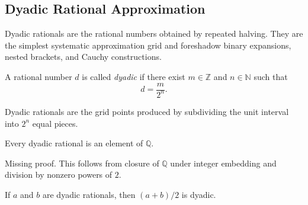 
\subsection{Dyadic Rational Approximation}
\label{sec:dyadic-rational-approximation}

Dyadic rationals are the rational numbers obtained by repeated halving. They are the simplest systematic approximation grid and foreshadow binary expansions, nested brackets, and Cauchy constructions.

\begin{definition}
\label{def:dyadic-rational}
A rational number $d$ is called \emph{dyadic} if there exist $m\in\mathbb{Z}$ and $n\in\mathbb{N}$ such that
\[
d=\frac{m}{2^n}.
\]
\end{definition}

\begin{remark*}[Interpretation]
Dyadic rationals are the grid points produced by subdividing the unit interval into $2^n$ equal pieces.
\end{remark*}

\begin{tcolorbox}[colback=thmbox, colframe=thmborder, arc=2pt,
  left=6pt, right=6pt, top=4pt, bottom=4pt,
  title={\small\textbf{Theorem (Dyadic Rationals Are Rational)}},
  fonttitle=\small\bfseries]
\begin{theorem}
\label{thm:dyadic-rationals-are-rational}
Every dyadic rational is an element of $\mathbb{Q}$.
\end{theorem}
\end{tcolorbox}

\begin{remark*}[Status]
Missing proof. This follows from closure of $\mathbb{Q}$ under integer embedding and division by nonzero powers of $2$.
\end{remark*}

\begin{tcolorbox}[colback=thmbox, colframe=thmborder, arc=2pt,
  left=6pt, right=6pt, top=4pt, bottom=4pt,
  title={\small\textbf{Theorem (Dyadic Midpoint Closure)}},
  fonttitle=\small\bfseries]
\begin{theorem}
\label{thm:dyadic-midpoint-closure}
If $a$ and $b$ are dyadic rationals, then $(a+b)/2$ is dyadic.
\end{theorem}
\end{tcolorbox}

